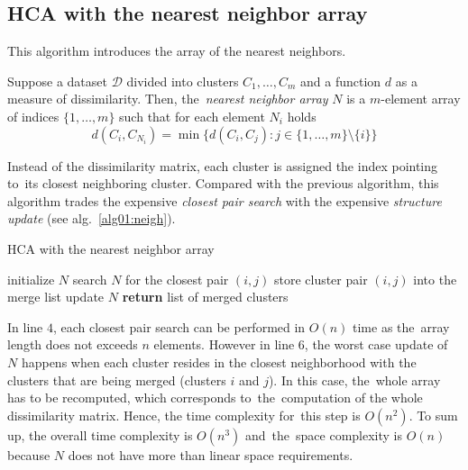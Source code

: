 \subsection{HCA with the nearest neighbor array}
This algorithm introduces the array of the nearest neighbors.

\begin{defn}
	Suppose a dataset $\mathcal{D}$ divided into clusters $C_1,\dots,C_m$ and a function $d$ as a measure of dissimilarity. Then, the~\emph{nearest neighbor array} $N$ is a $m$-element array of indices $\{1,\dots,m\}$ such that for each element $N_i$ holds
	$$d(C_i,C_{N_i}) = \min\{d(C_i,C_j) : j \in \{1,\dots,m\} \setminus \{i\}\}$$
	\label{def01:neigh}
\end{defn}

Instead of the dissimilarity matrix, each cluster is assigned the index pointing to~its closest neighboring cluster. 
Compared with the previous algorithm, this algorithm trades the expensive \emph{closest pair search} with the expensive \emph{structure update}  (see alg.~\ref{alg01:neigh}).



\begin{algorithm}[t]
	\caption{HCA with the nearest neighbor array}
	\label{alg01:neigh}
	\begin{algorithmic}[1]
		\State initialize $N$
		\State search $N$ for the closest pair $(i,j)$ 
		\State store cluster pair $(i,j)$ into the merge list 
		\State update $N$ 
		\EndFor
		\State \textbf{return} list of merged clusters
		\EndProcedure
	\end{algorithmic}
\end{algorithm}


In line $4$, each closest pair search can be performed in $O(n)$ time as the~array length does not exceeds $n$ elements. However in line $6$, the worst case update of $N$ happens when each cluster resides in the closest neighborhood with the clusters that are being merged (clusters $i$  and $j$). In this case, the~whole array has to be recomputed, which corresponds to~the~computation of the whole dissimilarity matrix. Hence, the time complexity for~this step is $O(n^2)$. To sum up, the overall time complexity is $O(n^3)$ and~the~space complexity is $O(n)$ because $N$ does not have more than linear space requirements.

